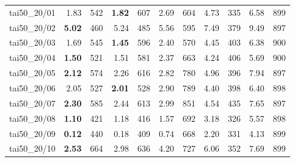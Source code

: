 \begin{longtable}{l | rr | rr | rr | rr | rr}
\hline
tai50_20/01    & 1.83 & 542 & \textbf{1.82} & 607 & 2.69 & 604 & 4.73 & 335 & 6.58 & 899 \\
tai50_20/02    & \textbf{5.02} & 460 & 5.24 & 485 & 5.56 & 595 & 7.49 & 379 & 9.49 & 897 \\
tai50_20/03    & 1.69 & 545 & \textbf{1.45} & 596 & 2.40 & 570 & 4.45 & 403 & 6.38 & 900 \\
tai50_20/04    & \textbf{1.50} & 521 & 1.51 & 581 & 2.37 & 663 & 4.24 & 406 & 5.69 & 900 \\
tai50_20/05    & \textbf{2.12} & 574 & 2.26 & 616 & 2.82 & 780 & 4.96 & 396 & 7.94 & 897 \\
tai50_20/06    & 2.05 & 527 & \textbf{2.01} & 528 & 2.90 & 789 & 4.40 & 398 & 6.40 & 898 \\
tai50_20/07    & \textbf{2.30} & 585 & 2.44 & 613 & 2.99 & 851 & 4.54 & 435 & 7.65 & 897 \\
tai50_20/08    & \textbf{1.10} & 421 & 1.18 & 416 & 1.57 & 692 & 3.18 & 326 & 5.57 & 898 \\
tai50_20/09    & \textbf{0.12} & 440 & 0.18 & 409 & 0.74 & 668 & 2.20 & 331 & 4.13 & 899 \\
tai50_20/10    & \textbf{2.53} & 664 & 2.98 & 636 & 4.20 & 727 & 6.06 & 352 & 7.69 & 899 \\
\end{longtable}
